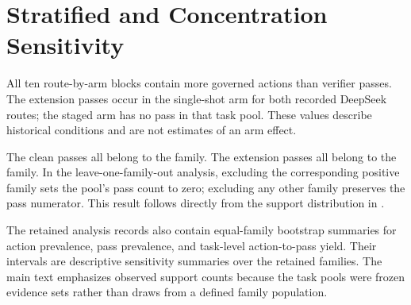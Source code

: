 \section{Stratified and Concentration Sensitivity}
\label{app:sensitivity}



All ten route-by-arm blocks contain more governed actions than verifier passes. The extension passes occur in the single-shot arm for both recorded DeepSeek routes; the staged arm has no pass in that task pool. These values describe historical conditions and are not estimates of an arm effect.



The clean passes all belong to the  family. The extension passes all belong to the  family. In the leave-one-family-out analysis, excluding the corresponding positive family sets the pool's pass count to zero; excluding any other family preserves the pass numerator. This result follows directly from the support distribution in .

The retained analysis records also contain equal-family bootstrap summaries for action prevalence, pass prevalence, and task-level action-to-pass yield. Their intervals are descriptive sensitivity summaries over the retained families. The main text emphasizes observed support counts because the task pools were frozen evidence sets rather than draws from a defined family population.
